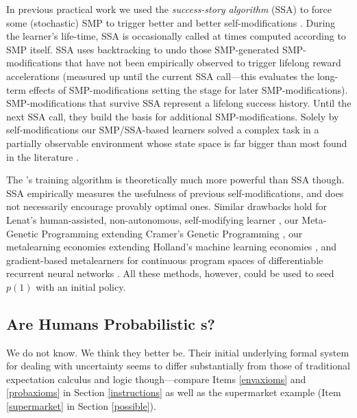 \begin{enumerate}
In previous practical work we used the {\em success-story algorithm} (SSA)
to force some (stochastic) SMP to trigger better and better
self-modifications
\cite{Schmidhuber:94self,Schmidhuber:96meta,Schmidhuber:97ssa,Schmidhuber:97bias}.
During the learner's life-time, SSA is occasionally called at times computed
according to SMP itself. SSA uses backtracking to undo those SMP-generated
SMP-modifications that have not been empirically observed to trigger
lifelong reward accelerations (measured up until the current SSA
call---this evaluates the long-term effects of SMP-modifications setting the
stage for later SMP-modifications). SMP-mo\-di\-fi\-ca\-tions that survive SSA
represent a lifelong success history. Until the next SSA call, they build
the basis for additional SMP-modifications. Solely by self-modifications
our SMP/SSA-based learners solved a complex task in a partially observable
environment whose state space is far bigger than most found in
the literature \cite{Schmidhuber:97ssa}.
 
 The \gmn's training algorithm is theoretically
 much more powerful than SSA though.
 SSA empirically measures the usefulness of previous
 self-modifications, and does not necessarily encourage
 provably optimal ones.
 Similar drawbacks hold for
 Lenat's human-assisted, non-autonomous,
 self-modifying learner \cite{Lenat:83},
 our Meta-Genetic Programming \cite{Schmidhuber:87} extending
 Cramer's Genetic Programming \cite{Cramer:85,Banzhaf:98},
 our metalearning economies \cite{Schmidhuber:87}
 extending Holland's machine learning eco\-no\-mies \cite{Holland:85},
 and gradient-based metalearners
 for continuous program spaces of differentiable
 recurrent neural networks
 \cite{Schmidhuber:93selfreficann,Hochreiter:01meta}.
 All these methods, however, could be used to seed
 $p(1)$ with an initial policy.
 \\
\end{enumerate}

\subsection{Are Humans Probabilistic \GMn s?}
\label{human}
We do not know. We think they better be.
Their initial underlying formal system for dealing with uncertainty
seems to differ substantially from those of
traditional expectation calculus and logic though---compare Items
\ref{envaxioms} and \ref{probaxioms} in Section \ref{instructions} as
well as the supermarket example 
(Item \ref{supermarket} in Section \ref{possible}).

